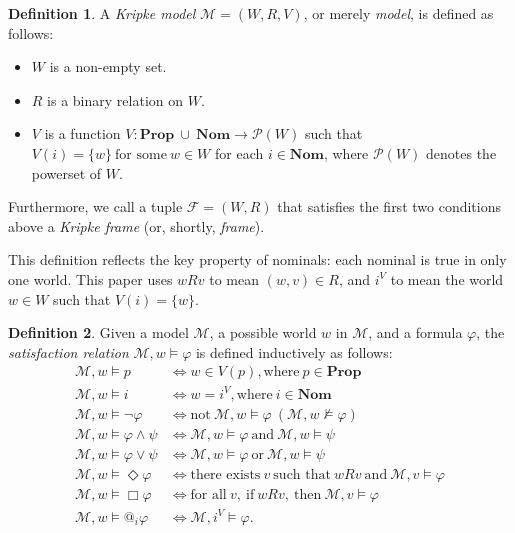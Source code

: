 \documentclass{article}
\theoremstyle{definition}
\newtheorem{definition}{Definition}[section]
\newcommand{\Prop}{\mathbf{Prop}}
\newcommand{\Nom}{\mathbf{Nom}}
\newcommand{\Dia}{\Diamond}
\newcommand{\Kmodel}{\mathcal{M}}
\newcommand{\Kframe}{\mathcal{F}}
\begin{document}
\begin{definition}
  A \emph{Kripke model} $\Kmodel = (W, R, V)$, or merely \emph{model}, is defined as follows:
  \begin{itemize}
    \item $W$ is a non-empty set.
    \item $R$ is a binary relation on $W$.
    \item $V$ is a function $V:\Prop \ \cup \ \Nom \to \mathcal{P}(W)$ such that $V(i) = \{ w \} \ \text{for some} \ w \in W$ for each $i \in \Nom$, where $\mathcal{P}(W)$ denotes the powerset of $W$.
  \end{itemize}

  Furthermore, we call a tuple $\Kframe = (W, R)$ that satisfies the first two conditions above a \emph{Kripke frame} (or, shortly, \emph{frame}).
\end{definition}

This definition reflects the key property of nominals: each nominal is true in only one world. This paper uses $w R v$ to mean $(w, v) \in R$, and $i^V$ to mean the world $w \in W$ such that $V(i) = \{ w \}$.

\begin{definition}
  Given a model $\Kmodel$, a possible world $w$ in $\Kmodel$, and a formula $\varphi$, the \emph{satisfaction relation} $\Kmodel, w \models \varphi$ is defined inductively as follows:
  \begin{align*}
    \Kmodel, w \models p &\iff w \in V(p), \text{where} \ p \in \Prop \\
    \Kmodel, w \models i &\iff w = i^V, \text{where} \ i \in \Nom \\
    \Kmodel, w \models \neg \varphi &\iff \text{not} \ \Kmodel, w \models \varphi \ (\Kmodel, w \not \models \varphi) \\
    \Kmodel, w \models \varphi \land \psi &\iff \Kmodel, w \models \varphi \ \text{and} \ \Kmodel, w \models \psi \\
    \Kmodel, w \models \varphi \lor \psi &\iff \Kmodel, w \models \varphi \ \text{or} \ \Kmodel, w \models \psi \\
    \Kmodel, w \models \Dia \varphi &\iff \text{there exists} \ v \ \text{such that} \ w R v \ \text{and} \ \Kmodel, v \models \varphi \\
    \Kmodel, w \models \Box \varphi &\iff \text{for all} \ v, \ \text{if} \ w R v, \ \text{then} \ \Kmodel, v \models \varphi \\
    \Kmodel, w \models @_i \varphi &\iff \Kmodel, i^V \models \varphi.
  \end{align*}
  \label{defsatis}
\end{definition}
\end{document}
